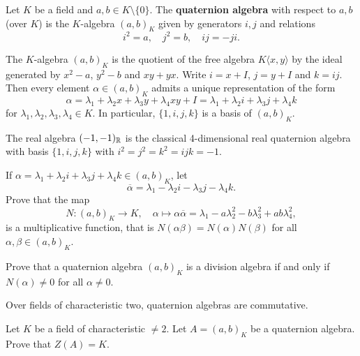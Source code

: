

\begin{definition}
    Let $K$ be a field and $a,b\in K\setminus\{0\}$. The \textbf{quaternion algebra}
    with respect to $a,b$ (over $K$) is the $K$-algebra
    $(a,b)_K$ given by generators $i,j$ and relations
    \[
    i^2=a,\quad 
    j^2=b,\quad 
    ij=-ji.
    \] 
\end{definition}

The $K$-algebra $(a,b)_K$ is the quotient of the free algebra $K\langle x,y\rangle$ 
by the ideal generated by $x^2-a$, $y^2-b$ and $xy+yx$. Write
$i=x+I$, $j=y+I$ and $k=ij$. Then every element $\alpha\in(a,b)_K$ admits a unique
representation of the form
\[
\alpha=\lambda_1+\lambda_2x+\lambda_3y+\lambda_4xy+I=\lambda_1+\lambda_2i+\lambda_3j+\lambda_4k
\]
for $\lambda_1,\lambda_2,\lambda_3,\lambda_4\in K$. 
In particular, $\{1,i,j,k\}$ is a basis of $(a,b)_K$. 

\begin{example}
The real algebra $(-1,-1)_{\mathbb{R}}$ is the classical 
4-dimensional real 
quaternion algebra with basis $\{1,i,j,k\}$ with 
$i^2=j^2=k^2=ijk=-1$. 
\end{example}

\begin{exercise}
    If $\alpha=\lambda_1+\lambda_2i+\lambda_3j+\lambda_4k\in (a,b)_K$, let 
    \[
    \overline{\alpha}=\lambda_1-\lambda_2i-\lambda_3j-\lambda_4k. 
    \]
    Prove that the map 
    \[
    N\colon (a,b)_K\to K,
    \quad 
    \alpha\mapsto \alpha\overline{\alpha}=\lambda_1-a\lambda_2^2-b\lambda_3^2+ab\lambda_4^2,
    \]
    is a multiplicative function, that is $N(\alpha\beta)=N(\alpha)N(\beta)$ for all $\alpha,\beta\in (a,b)_K$. 
\end{exercise}

\begin{exercise}
    Prove that a quaternion algebra 
    $(a,b)_K$ is a division algebra if and only if $N(\alpha)\ne 0$ for all $\alpha\ne0$. 
\end{exercise}

Over fields of characteristic two, quaternion algebras are commutative. 

\begin{exercise}
    Let $K$ be a field of characteristic $\ne2$. 
    Let $A=(a,b)_K$ be a quaternion algebra. 
    Prove that $Z(A)=K$. 
\end{exercise}

